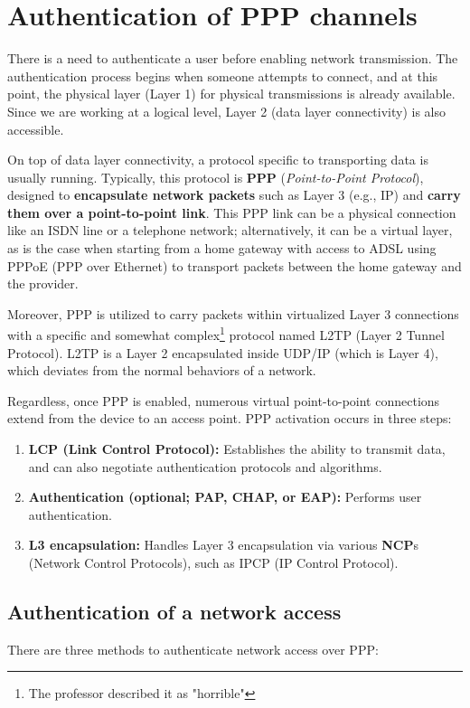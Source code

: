 \section{Authentication of PPP channels}
There is a need to authenticate a user before enabling network transmission. The authentication process begins when someone attempts to connect, and at this point, the physical layer (Layer 1) for physical transmissions is already available. Since we are working at a logical level, Layer 2 (data layer connectivity) is also accessible.

On top of data layer connectivity, a protocol specific to transporting data is usually running. Typically, this protocol is \textbf{PPP} (\textit{Point-to-Point Protocol}), designed to \textbf{encapsulate network packets} such as Layer 3 (e.g., IP) and \textbf{carry them over a point-to-point link}. This PPP link can be a physical connection like an ISDN line or a telephone network; alternatively, it can be a virtual layer, as is the case when starting from a home gateway with access to ADSL using PPPoE (PPP over Ethernet) to transport packets between the home gateway and the provider.

Moreover, PPP is utilized to carry packets within virtualized Layer 3 connections with a specific and somewhat complex\footnote{The professor described it as "horrible"} protocol named L2TP (Layer 2 Tunnel Protocol). L2TP is a Layer 2 encapsulated inside UDP/IP (which is Layer 4), which deviates from the normal behaviors of a network.

Regardless, once PPP is enabled, numerous virtual point-to-point connections extend from the device to an access point. PPP activation occurs in three steps:

\begin{enumerate}
    \item \textbf{LCP (Link Control Protocol):} Establishes the ability to transmit data, and can also negotiate authentication protocols and algorithms.
    \item \textbf{Authentication (optional; PAP, CHAP, or EAP):} Performs user authentication.
    \item \textbf{L3 encapsulation:} Handles Layer 3 encapsulation via various \textbf{NCP}s (Network Control Protocols), such as IPCP (IP Control Protocol).
\end{enumerate}




\subsection{Authentication of a network access}
There are three methods to authenticate network access over PPP:

